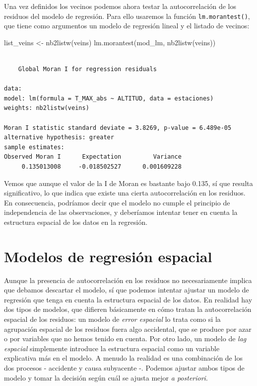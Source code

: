 \documentclass[
  letterpaper,
  DIV=11,
  numbers=noendperiod]{scrreprt}
\newenvironment{Shaded}{\begin{snugshade}}{\end{snugshade}}
\newcommand{\FunctionTok}[1]{\textcolor[rgb]{0.28,0.35,0.67}{#1}}
\newcommand{\NormalTok}[1]{\textcolor[rgb]{0.00,0.23,0.31}{#1}}
\newcommand{\OtherTok}[1]{\textcolor[rgb]{0.00,0.23,0.31}{#1}}
\begin{document}
Una vez definidos los vecinos podemos ahora testar la autocorrelación de
los residuos del modelo de regresión. Para ello usaremos la función
\texttt{lm.morantest()}, que tiene como argumentos un modelo de
regresión lineal y el listado de vecinos:

\begin{Shaded}
\begin{Highlighting}[]
\NormalTok{list\_veins }\OtherTok{\textless{}{-}} \FunctionTok{nb2listw}\NormalTok{(veins)}
\FunctionTok{lm.morantest}\NormalTok{(mod\_lm, }\FunctionTok{nb2listw}\NormalTok{(veins))}
\end{Highlighting}
\end{Shaded}

\begin{verbatim}

    Global Moran I for regression residuals

data:  
model: lm(formula = T_MAX_abs ~ ALTITUD, data = estaciones)
weights: nb2listw(veins)

Moran I statistic standard deviate = 3.8269, p-value = 6.489e-05
alternative hypothesis: greater
sample estimates:
Observed Moran I      Expectation         Variance 
     0.135013008     -0.018502527      0.001609228 
\end{verbatim}

Vemos que aunque el valor de la I de Moran es bastante bajo 0.135, sí
que resulta significativo, lo que indica que existe una cierta
autocorrelación en los residuos. En consecuencia, podríamos decir que el
modelo no cumple el principio de independencia de las observaciones, y
deberíamos intentar tener en cuenta la estructura espacial de los datos
en la regresión.

\hypertarget{modelos-de-regresiuxf3n-espacial}{%
\section{Modelos de regresión
espacial}\label{modelos-de-regresiuxf3n-espacial}}

Aunque la presencia de autocorrelación en los residuos no necesariamente
implica que debamos descartar el modelo, sí que podemos intentar ajustar
un modelo de regresión que tenga en cuenta la estructura espacial de los
datos. En realidad hay dos tipos de modelos, que difieren básicamente en
cómo tratan la autocorrelación espacial de los residuos: un modelo de
\emph{error espacial} lo trata como si la agrupación espacial de los
residuos fuera algo accidental, que se produce por azar o por variables
que no hemos tenido en cuenta. Por otro lado, un modelo de \emph{lag
espacial} simplemente introduce la estructura espacial como un variable
explicativa más en el modelo. A menudo la realidad es una combinación de
los dos procesos - accidente y causa subyacente -. Podemos ajustar ambos
tipos de modelo y tomar la decisión según cuál se ajusta mejor \emph{a
posteriori}.
\end{document}
